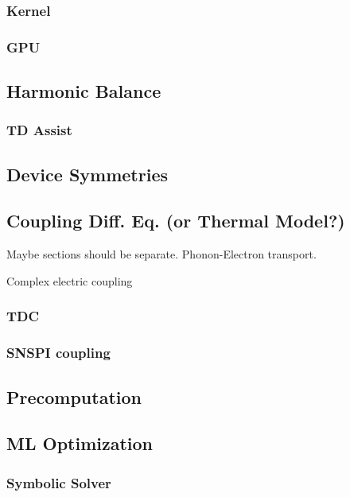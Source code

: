 \documentclass[]{article}
\begin{document}
\subsubsection{Kernel}

\subsubsection{GPU}

\subsection{Harmonic Balance} \label{julia-sim-hb}

\subsubsection{TD Assist}

\subsection{Device Symmetries}

\subsection{Coupling Diff. Eq. (or Thermal Model?)}

Maybe sections should be separate. Phonon-Electron transport.

Complex electric coupling

\subsubsection{TDC}

\subsubsection{SNSPI coupling}

\subsection{Precomputation}

\subsection{ML Optimization}

\subsubsection{Symbolic Solver}
\end{document}
